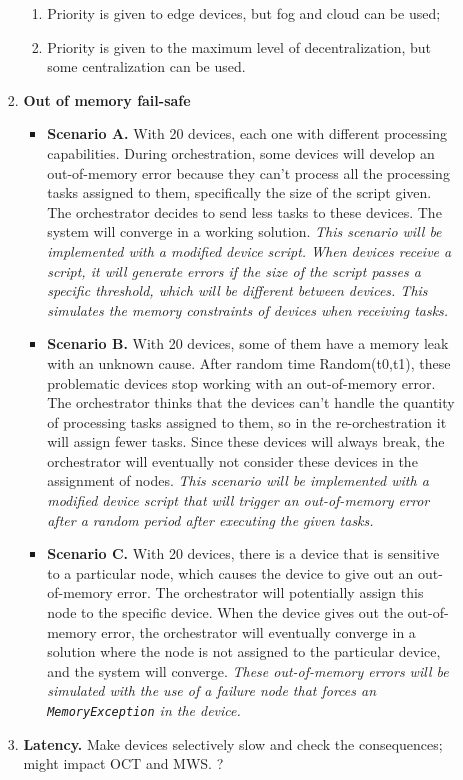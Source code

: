 \begin{enumerate}
\begin{enumerate}
\begin{enumerate}
\begin{enumerate}
                            \item Priority is given to edge devices, but fog and cloud can be used;
                            \item Priority is given to the maximum level of decentralization, but some centralization can be used.
                        \end{enumerate}
                    \item \textbf{Out of memory fail-safe}
                        \begin{itemize}
                            \item \textbf{Scenario A.} With 20 devices, each one with different processing capabilities. During orchestration, some devices will develop an out-of-memory error because they can't process all the processing tasks assigned to them, specifically the size of the script given. The orchestrator decides to send less tasks to these devices. The system will converge in a working solution. \textit{This scenario will be implemented with a modified device script. When devices receive a script, it will generate errors if the size of the script passes a specific threshold, which will be different between devices. This simulates the memory constraints of devices when receiving tasks.}
                            \item \textbf{Scenario B.} With 20 devices, some of them have a memory leak with an unknown cause. After random time Random(t0,t1), these problematic devices stop working with an out-of-memory error. The orchestrator thinks that the devices can't handle the quantity of processing tasks assigned to them, so in the re-orchestration it will assign fewer tasks. Since these devices will always break, the orchestrator will eventually not consider these devices in the assignment of nodes. \textit{This scenario will be implemented with a modified device script that will trigger an out-of-memory error after a random period after executing the given tasks.}
                            \item \textbf{Scenario C.} With 20 devices, there is a device that is sensitive to a particular node, which causes the device to give out an out-of-memory error. The orchestrator will potentially assign this node to the specific device. When the device gives out the out-of-memory error, the orchestrator will eventually converge in a solution where the node is not assigned to the particular device, and the system will converge.  \textit{These out-of-memory errors will be simulated with the use of a failure node that forces an \texttt{MemoryException} in the device.}
                        \end{itemize}
                    \item \textbf{Latency.} Make devices selectively slow and check the consequences; might impact OCT and MWS. ?
                \end{enumerate}
        \end{enumerate}
\end{enumerate}




